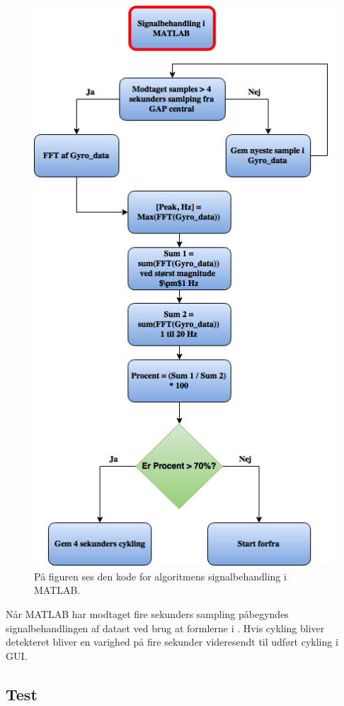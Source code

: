 \begin{figure}[H]
	\centering
	\includegraphics[scale=0.4]{figures/cDesign/algoritme_matlab_cykling.png}
	\caption{På figuren ses den kode for algoritmens signalbehandling i MATLAB.}
	\label{fig:matlab_cykling}
\end{figure} 
Når MATLAB har modtaget fire sekunders sampling påbegyndes signalbehandlingen af dataet ved brug at formlerne i . Hvis cykling bliver detekteret bliver en varighed på fire sekunder videresendt til udført cykling i GUI. 


\subsection{Test}

